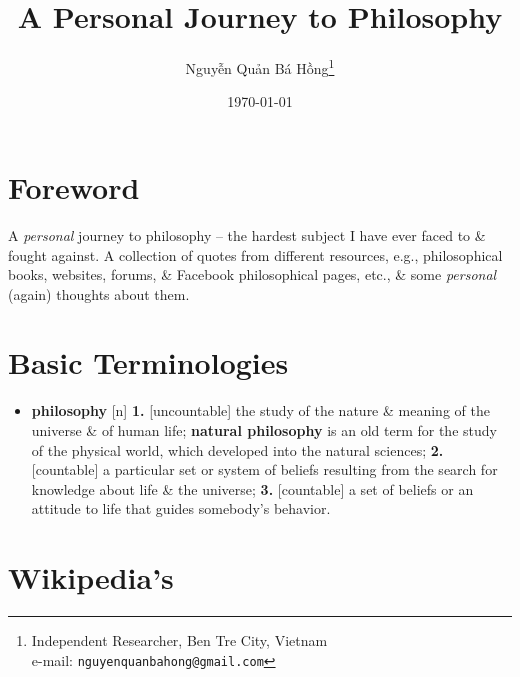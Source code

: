 \documentclass[oneside]{book}
\title{A Personal Journey to Philosophy}
\author{\selectlanguage{vietnamese} Nguyễn Quản Bá Hồng\footnote{Independent Researcher, Ben Tre City, Vietnam\\e-mail: \texttt{nguyenquanbahong@gmail.com}}}
\date{\today}
\numberwithin{equation}{section}
\begin{document}
\maketitle
{}
\setcounter{secnumdepth}{4}
\setcounter{tocdepth}{4}
\tableofcontents


\chapter*{Foreword}

A \textit{personal} journey to philosophy -- the hardest subject I have ever faced to \& fought against. A collection of quotes from different resources, e.g., philosophical books, websites, forums, \& Facebook philosophical pages, etc., \& some \textit{personal} (again) thoughts about them.


\chapter*{Basic Terminologies}
\begin{itemize}
	\item \textbf{philosophy} [n] \textbf{1.} [uncountable] the study of the nature \& meaning of the universe \& of human life; \textbf{natural philosophy} is an old term for the study of the physical world, which developed into the natural sciences; \textbf{2.} [countable] a particular set or system of beliefs resulting from the search for knowledge about life \& the universe; \textbf{3.} [countable] a set of beliefs or an attitude to life that guides somebody's behavior.
\end{itemize}


\chapter{Wikipedia's}
\end{document}
